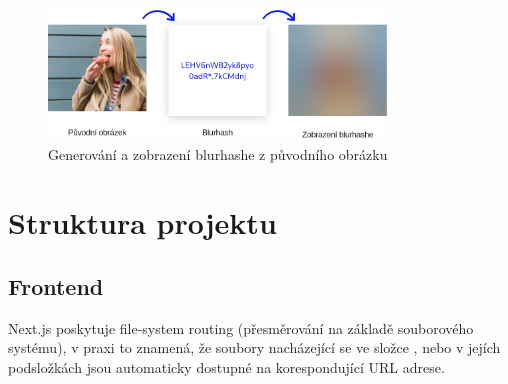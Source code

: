 \documentclass[12pt, a4paper,
 twoside,        %
 openright
]{report}
\begin{document}
\begin{figure}[h]
	\centering
	\includegraphics[width=0.8\textwidth]{images/blurhash.png}
	\caption{Generování a zobrazení blurhashe z původního obrázku \cite{blurhashScreenshot}}
\end{figure}

\chapter{Struktura projektu}
\section{Frontend}\label{subsection:fileSystemRouting}
Next.js poskytuje file-system routing (přesměrování na základě souborového systému), v praxi to znamená, že soubory nacházející se ve složce , nebo v jejích podsložkách jsou automaticky dostupné na korespondující URL adrese.
\end{document}
